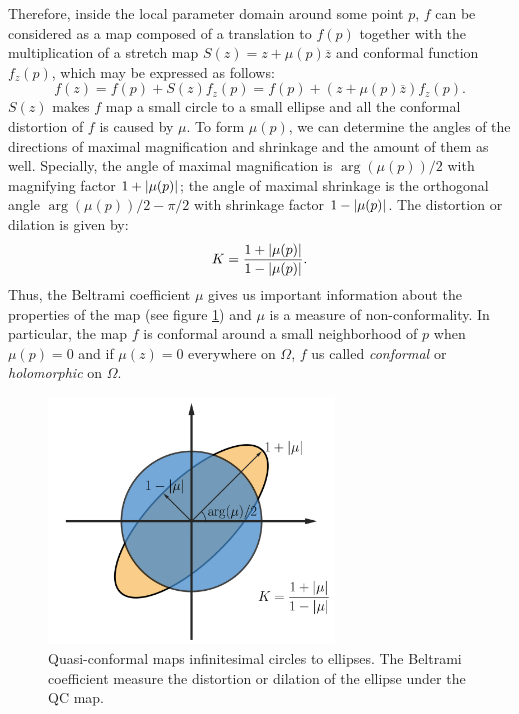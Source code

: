 \documentclass[review,onefignum,onetabnum]{siamonline190516}
\begin{document}
        Therefore, inside the local parameter domain around some point $p$, $f$ can be considered as a map composed of a translation to $f(p)$ together with the multiplication of a stretch map $S(z) = z + \mu(p)\overline{z}$ and conformal function $f_z(p)$, which may be expressed as follows:
        \begin{equation}\label{local f}
            f(z) =  f(p)+S(z)f_z(p) = f(p)+(z+\mu(p)\overline{z})f_z(p).
        \end{equation}
        $S(z)$ makes $f$ map a small circle to a small ellipse and all the conformal distortion of $f$ is caused by $\mu$. To form $\mu(p)$, we can determine the angles of the directions of maximal magnification and shrinkage and the amount of them as well. Specially, the angle of maximal magnification is $\arg(\mu(p))/2$ with magnifying factor $1+\left\vert \mu(p) \right\vert$; the angle of maximal shrinkage is the orthogonal angle $\arg(\mu(p))/2 - \pi/2$ with shrinkage factor $1-\left\vert \mu(p) \right\vert$. The distortion or dilation is given by:
        \begin{equation}
            K = \frac{1+\left\vert \mu(p) \right\vert}{1-\left\vert \mu(p) \right\vert}.
        \end{equation}
        Thus, the Beltrami coefficient $\mu$ gives us important information about the properties of the map (see figure \ref{fig3}) and $\mu$ is a measure of non-conformality. In particular, the map $f$ is conformal around a small neighborhood of $p$ when $\mu(p)=0$ and if $\mu(z)=0$ everywhere on $\Omega$, $f$ us called \textit{conformal} or \textit{holomorphic} on $\Omega$.

        \begin{figure}
            \begin{center}
                \includegraphics[width=7.6cm]{fig3.png}
            \end{center}
            \caption{Quasi-conformal maps infinitesimal circles to ellipses. The Beltrami coefficient measure the distortion or dilation of the ellipse under the QC map.}
            \label{fig3}
        \end{figure}
\end{document}
